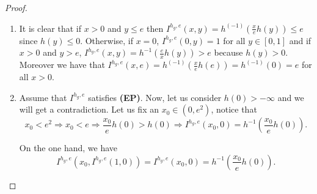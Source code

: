 \begin{proof}
	\hspace{0.5cm}
	\begin{enumerate}[label=(\roman*)]
		\item It is clear that if $x>0$ and $y \leq e$ then $I^{h_g,e}(x,y)= h^{(-1)}\left(\frac{x}{e}h(y) \right) \leq e$ since $h(y) \leq 0$. Otherwise, if $x=0$, $I^{h_g,e}(0,y)=1$ for all $y \in [0,1]$ and if $x>0$ and $y>e$, $I^{h_g,e}(x,y)=h^{-1}\left(\frac{e}{x}h(y) \right)>e$ because $h(y)>0$. Moreover we have that $I^{h_g,e}(x,e)=h^{(-1)}\left(\frac{x}{e}h(e)\right)=h^{(-1)}(0)=e$ for all $x>0$.
		\item Assume that $I^{h_g,e}$ satisfies {\bf (EP)}. Now, let us consider $h(0)>-\infty$ and we will get a contradiction. Let us fix an $x_0 \in (0,e^2)$, notice that 
		$$ x_0 <e^2 \Rightarrow x_0 <e \Rightarrow \frac{x_0}{e}h(0) > h(0) \Rightarrow I^{h_g,e}(x_0,0)= h^{-1}\left(\frac{x_0}{e}h(0)\right).$$
		
		On the one hand, we have
		$$I^{h_g,e}(x_0,I^{h_g,e}(1,0))= I^{h_g,e}(x_0,0) = h^{-1}\left(\frac{x_0}{e}h(0)\right).$$
		

\end{enumerate}
\end{proof}
